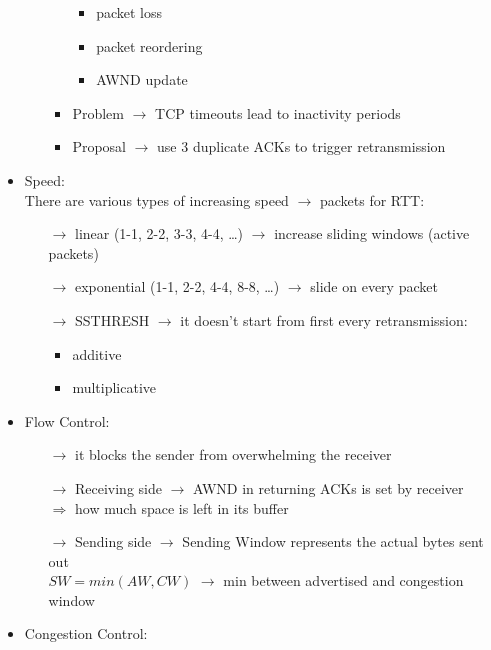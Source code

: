 \begin{itemize}
\begin{itemize}
\begin{itemize}
\begin{itemize}
                \item packet loss
                \item packet reordering
                \item AWND update
            \end{itemize}
            \item Problem $\rightarrow$ TCP timeouts lead to inactivity periods
            \item Proposal $\rightarrow$ use 3 duplicate ACKs to trigger retransmission
        \end{itemize}
    \end{itemize}
    \item Speed:\\[0.2cm]
    There are various types of increasing speed $\rightarrow$ packets for RTT:
    \begin{itemize}
        \item[$\rightarrow$] linear (1-1, 2-2, 3-3, 4-4, \dots) $\rightarrow$ increase sliding windows (active packets)
        \item[$\rightarrow$] exponential (1-1, 2-2, 4-4, 8-8, \dots) $\rightarrow$ slide on every packet
        \item[$\rightarrow$] SSTHRESH $\rightarrow$ it doesn't start from first every retransmission:
        \begin{itemize}
            \item additive 
            \item multiplicative
        \end{itemize}
    \end{itemize}
    \item Flow Control:
    \begin{itemize}
        \item[$\rightarrow$] it blocks the sender from overwhelming the receiver
        \item[$\rightarrow$] Receiving side $\rightarrow$ AWND in returning ACKs is set by receiver\\
        $\Rightarrow$ how much space is left in its buffer
        \item[$\rightarrow$] Sending side $\rightarrow$ Sending Window represents the actual bytes sent out\\
        $SW = min(AW, CW)$ $\rightarrow$ min between advertised and congestion window
    \end{itemize}
    \item Congestion Control:
    \begin{itemize}

\end{itemize}
\end{itemize}
